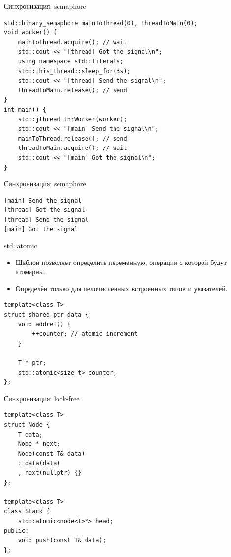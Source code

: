 \documentclass{beamer}
\begin{document}
\begin{frame}[fragile]{Синхронизация: semaphore}
    \begin{lstlisting}
std::binary_semaphore mainToThread(0), threadToMain(0);
void worker() {
	mainToThread.acquire(); // wait
	std::cout << "[thread] Got the signal\n";
	using namespace std::literals;
	std::this_thread::sleep_for(3s);
	std::cout << "[thread] Send the signal\n";
	threadToMain.release(); // send
}
int main() {
	std::jthread thrWorker(worker);
	std::cout << "[main] Send the signal\n";
	mainToThread.release(); // send
	threadToMain.acquire(); // wait
	std::cout << "[main] Got the signal\n";
}
\end{lstlisting}
\end{frame}

\begin{frame}[fragile]{Синхронизация: semaphore}
    \begin{lstlisting}
[main] Send the signal
[thread] Got the signal
[thread] Send the signal
[main] Got the signal
    \end{lstlisting}
\end{frame}

\begin{frame}[fragile]{std::atomic}
    \begin{itemize}
        \item Шаблон  позволяет определить переменную,
            операции с которой будут атомарны.
        \item Определён только для целочисленных встроенных типов и указателей.
    \end{itemize}

\begin{lstlisting}
template<class T>
struct shared_ptr_data {
    void addref() {
        ++counter; // atomic increment
    }
    
    T * ptr;
    std::atomic<size_t> counter;
};
\end{lstlisting}
\end{frame}

\begin{frame}[fragile]{Синхронизация: lock-free}
    \begin{lstlisting}
template<class T>
struct Node {
    T data;
    Node * next;
    Node(const T& data)
    : data(data)
    , next(nullptr) {}
};

template<class T>
class Stack {
    std::atomic<node<T>*> head;
public:
    void push(const T& data);
};
\end{lstlisting}
\end{frame}
\end{document}
